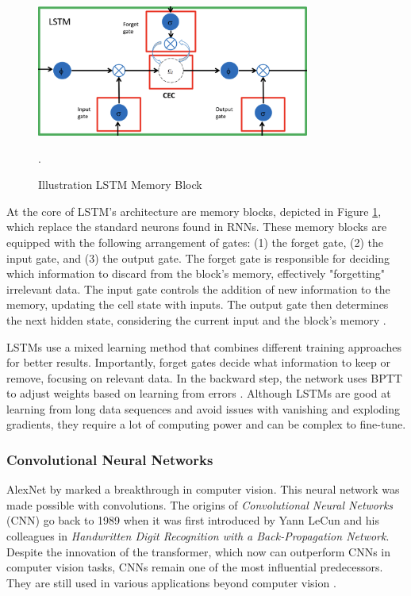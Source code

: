 \documentclass[12pt,a4paper]{article}
\begin{document}
\begin{figure}[htbp]
  \centering
  \includegraphics[width=0.8\textwidth]{lstm_illu.png}
  \caption{Illustration LSTM Memory Block \parencite{lstmsu2018}}.
  \label{lstmmemoryblock}
\end{figure}

At the core of LSTM's architecture are memory blocks, depicted in Figure \ref{lstmmemoryblock}, which replace the standard neurons found in RNNs. These memory blocks are equipped with the following arrangement of gates: (1) the forget gate, (2) the input gate, and (3) the output gate. The forget gate is responsible for deciding which information to discard from the block's memory, effectively "forgetting" irrelevant data. The input gate controls the addition of new information to the memory, updating the cell state with inputs. The output gate then determines the next hidden state, considering the current input and the block's memory \parencite{Staudemeyer2019}.

LSTMs use a mixed learning method that combines different training approaches for better results. Importantly, forget gates decide what information to keep or remove, focusing on relevant data. In the backward step, the network uses BPTT to adjust weights based on learning from errors \parencite{Staudemeyer2019}. Although LSTMs are good at learning from long data sequences and avoid issues with vanishing and exploding gradients, they require a lot of computing power and can be complex to fine-tune.

\subsubsection{Convolutional Neural Networks}
AlexNet by \cite{Krizhevsky2012} marked a breakthrough in computer vision. This neural network was made possible with convolutions. The origins of \textit{Convolutional Neural Networks} (CNN) go back to 1989 when it was first introduced by Yann LeCun and his colleagues in \textit{Handwritten Digit Recognition with a Back-Propagation Network}. Despite the innovation of the transformer, which now can outperform CNNs in computer vision tasks, CNNs remain one of the most influential predecessors. They are still used in various applications beyond computer vision \parencite{deininger2022comparative}.
\end{document}
